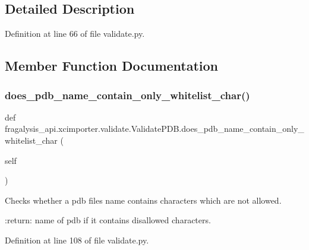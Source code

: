 \subsection{Detailed Description}


Definition at line 66 of file validate.\+py.



\subsection{Member Function Documentation}
\mbox{\label{classfragalysis__api_1_1xcimporter_1_1validate_1_1_validate_p_d_b_a0775261c2b35a1f1861dabccbba32d02}} 
\subsubsection{\texorpdfstring{does\+\_\+pdb\+\_\+name\+\_\+contain\+\_\+only\+\_\+whitelist\+\_\+char()}{does\_pdb\_name\_contain\_only\_whitelist\_char()}}
{\footnotesize\ttfamily def fragalysis\+\_\+api.\+xcimporter.\+validate.\+Validate\+P\+D\+B.\+does\+\_\+pdb\+\_\+name\+\_\+contain\+\_\+only\+\_\+whitelist\+\_\+char (\begin{DoxyParamCaption}\item[{}]{self }\end{DoxyParamCaption})}

\begin{DoxyVerb}Checks whether a pdb files name contains characters which are not allowed.

:return: name of pdb if it contains disallowed characters.
\end{DoxyVerb}
 

Definition at line 108 of file validate.\+py.


